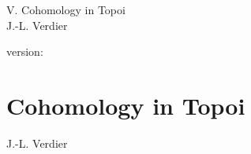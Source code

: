 \documentclass[10pt]{../fichiers-configuration-latex/smfart}
\begin{document}
\begin{center}
V. Cohomology in Topoi\\
J.-L. Verdier
\end{center}

version: \showgitstatus
\tableofcontents

\else
\chapter{Cohomology in Topoi}\label{sga4.exp.V}
\begin{center}
J.-L. Verdier
\end{center}
\fi

\setcounter{pageoriginal}{1}
































\end{document}
